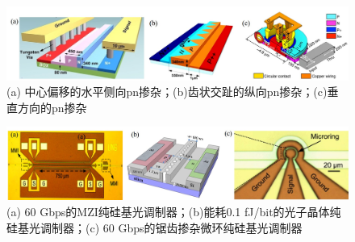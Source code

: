 \begin{figure}[htb]
	\centering
	\includegraphics[width=15cm]{./Pictures/fig_silicon_mod_cross.jpg}
	\caption{ (a) 中心偏移的水平侧向pn掺杂\cite{xiao2013high}；(b)齿状交趾的纵向pn掺杂\cite{Xiao201360}；(c)垂直方向的pn掺杂\cite{timurdogan2014ultralow}}
	\label{fig_silicon_mod_cross}
\end{figure}

\begin{figure}[htb]
	\centering
	\includegraphics[width=15cm]{./Pictures/fig_silicon_mod.jpg}
	\caption{ (a) 60 Gbps的MZI纯硅基光调制器\cite{Xiao201360}；(b)能耗0.1 fJ/bit的光子晶体纯硅基光调制器\cite{shakoor2014ultra}；(c) 60 Gbps的锯齿掺杂微环纯硅基光调制器\cite{Xiao201360}}
	\label{fig_silicon_mod}
\end{figure}
